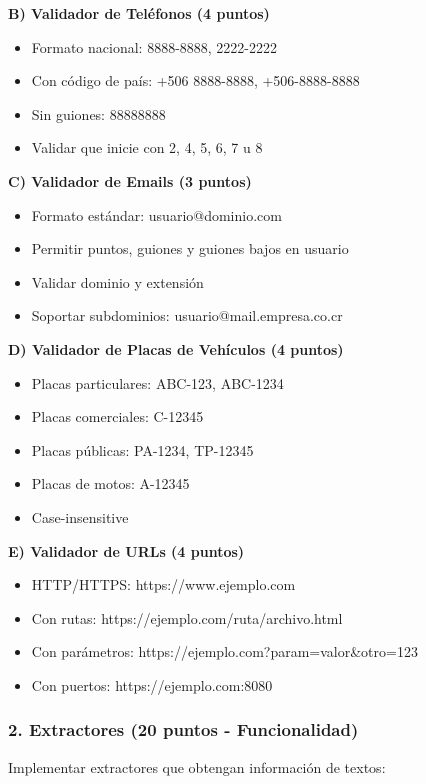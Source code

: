 \documentclass[11pt,letterpaper]{article}
\begin{document}
\textbf{B) Validador de Teléfonos (4 puntos)}
\begin{itemize}
    \item Formato nacional: 8888-8888, 2222-2222
    \item Con código de país: +506 8888-8888, +506-8888-8888
    \item Sin guiones: 88888888
    \item Validar que inicie con 2, 4, 5, 6, 7 u 8
\end{itemize}

\textbf{C) Validador de Emails (3 puntos)}
\begin{itemize}
    \item Formato estándar: usuario@dominio.com
    \item Permitir puntos, guiones y guiones bajos en usuario
    \item Validar dominio y extensión
    \item Soportar subdominios: usuario@mail.empresa.co.cr
\end{itemize}

\textbf{D) Validador de Placas de Vehículos (4 puntos)}
\begin{itemize}
    \item Placas particulares: ABC-123, ABC-1234
    \item Placas comerciales: C-12345
    \item Placas públicas: PA-1234, TP-12345
    \item Placas de motos: A-12345
    \item Case-insensitive
\end{itemize}

\textbf{E) Validador de URLs (4 puntos)}
\begin{itemize}
    \item HTTP/HTTPS: https://www.ejemplo.com
    \item Con rutas: https://ejemplo.com/ruta/archivo.html
    \item Con parámetros: https://ejemplo.com?param=valor\&otro=123
    \item Con puertos: https://ejemplo.com:8080
\end{itemize}

\subsubsection{2. Extractores (20 puntos - Funcionalidad)}

Implementar extractores que obtengan información de textos:
\end{document}
